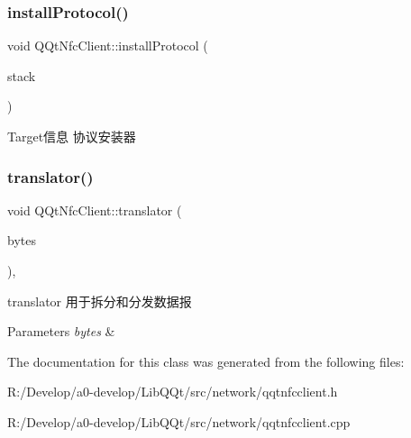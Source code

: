 \subsubsection{\texorpdfstring{install\+Protocol()}{installProtocol()}}
{\footnotesize\ttfamily void Q\+Qt\+Nfc\+Client\+::install\+Protocol (\begin{DoxyParamCaption}\item[{\mbox{\hyperlink{class_q_qt_protocol}{Q\+Qt\+Protocol}} $\ast$}]{stack }\end{DoxyParamCaption})}

Target信息 协议安装器 \mbox{\label{class_q_qt_nfc_client_a5b8bb64f83317f7d12370c473a66e4f0}} 
\subsubsection{\texorpdfstring{translator()}{translator()}}
{\footnotesize\ttfamily void Q\+Qt\+Nfc\+Client\+::translator (\begin{DoxyParamCaption}\item[{const Q\+Byte\+Array \&}]{bytes }\end{DoxyParamCaption})\hspace{0.3cm}{\ttfamily [protected]}, {\ttfamily [virtual]}}



translator 用于拆分和分发数据报 


\begin{DoxyParams}{Parameters}
{\em bytes} & \\
\hline
\end{DoxyParams}


The documentation for this class was generated from the following files\+:\begin{DoxyCompactItemize}
\item 
R\+:/\+Develop/a0-\/develop/\+Lib\+Q\+Qt/src/network/qqtnfcclient.\+h\item 
R\+:/\+Develop/a0-\/develop/\+Lib\+Q\+Qt/src/network/qqtnfcclient.\+cpp\end{DoxyCompactItemize}
